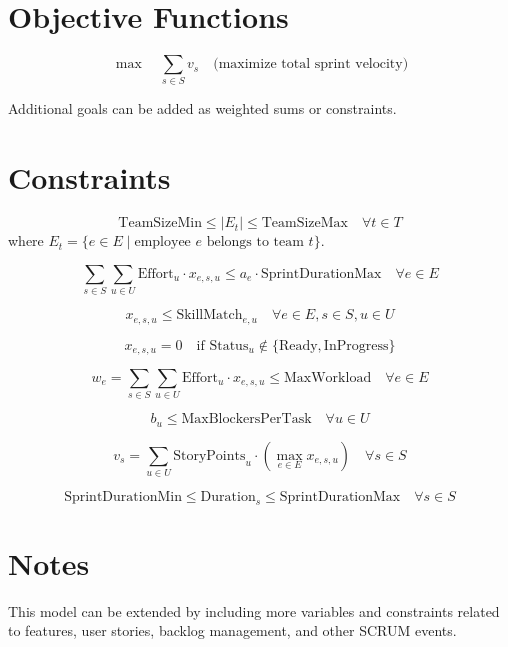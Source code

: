 \documentclass{article}
\begin{document}
\section*{Objective Functions}
\[
\max \quad \sum_{s \in S} v_s \quad \text{(maximize total sprint velocity)}
\]

Additional goals can be added as weighted sums or constraints.

\section*{Constraints}

\[
\text{TeamSizeMin} \leq |E_t| \leq \text{TeamSizeMax} \quad \forall t \in T
\]
where \(E_t = \{ e \in E \mid \text{employee } e \text{ belongs to team } t \}\).

\[
\sum_{s \in S} \sum_{u \in U} \text{Effort}_u \cdot x_{e,s,u} \leq a_e \cdot \text{SprintDurationMax} \quad \forall e \in E
\]

\[
x_{e,s,u} \leq \text{SkillMatch}_{e,u} \quad \forall e \in E, s \in S, u \in U
\]

\[
x_{e,s,u} = 0 \quad \text{if } \text{Status}_u \notin \{\text{Ready}, \text{InProgress}\}
\]

\[
w_e = \sum_{s \in S} \sum_{u \in U} \text{Effort}_u \cdot x_{e,s,u} \leq \text{MaxWorkload} \quad \forall e \in E
\]

\[
b_u \leq \text{MaxBlockersPerTask} \quad \forall u \in U
\]

\[
v_s = \sum_{u \in U} \text{StoryPoints}_u \cdot \left( \max_{e \in E} x_{e,s,u} \right) \quad \forall s \in S
\]

\[
\text{SprintDurationMin} \leq \text{Duration}_s \leq \text{SprintDurationMax} \quad \forall s \in S
\]

\section*{Notes}
This model can be extended by including more variables and constraints related to features, user stories, backlog management, and other SCRUM events.
\end{document}
